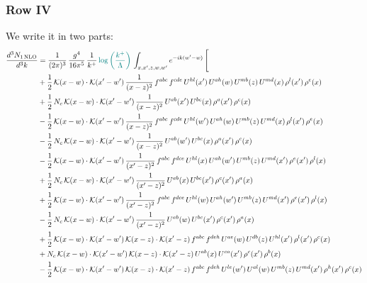 \documentclass[9pt]{article}
\numberwithin{equation}{section}
\begin{document}
\subsubsection{Row IV}
We write it in two parts: 
\begin{align}
\frac{d^{3}N_{1\,\mathrm{NLO}}}{d^{3}k} & = \frac{1}{(2\pi)^{3}}\,\frac{g^{4}}{16\pi^{5}}\,\frac{1}{k^{+}}\,{\color{teal}\log{\left(\frac{k^{+}}{\Lambda}\right)}}\,\int_{x,x',z,w,w'}e^{-ik(w'-w)}\,\Bigg[\notag\\ & 
 +\frac{1}{2}\,\mathcal{K}(x-w)\cdot\mathcal{K}(x'-w')\,\frac{1}{(x-z)^{2}}\,f^{abc}\,f^{cde}\,U^{hl}(x')\,U^{ah}(w)\,U^{mb}(z)\,U^{md}(x)\,\rho^{l}(x')\,\rho^{e}(x)\notag\\
& +\frac{1}{2}\,N_{c}\,\mathcal{K}(x-w)\cdot\mathcal{K}(x'-w')\,\frac{1}{(x-z)^{2}}\,U^{ab}(x')\,U^{bc}(x)\,\rho^{a}(x')\,\rho^{c}(x)\notag\\
& -\frac{1}{2}\,\mathcal{K}(x-w)\cdot\mathcal{K}(x'-w')\,\frac{1}{(x-z)^{2}}\,f^{abc}\,f^{cde}\,U^{hl}(w')\,U^{ah}(w)\,U^{mb}(z)\,U^{md}(x)\,\rho^{l}(x')\,\rho^{e}(x)\notag\\
& -\frac{1}{2}\,N_{c}\,\mathcal{K}(x-w)\cdot\mathcal{K}(x'-w')\,\frac{1}{(x-z)^{2}}\,U^{ab}(w')\,U^{bc}(x)\,\rho^{a}(x')\,\rho^{c}(x)\notag\\
& -\frac{1}{2}\,\mathcal{K}(x-w)\cdot\mathcal{K}(x'-w')\,\frac{1}{(x'-z)^{2}}\,f^{abc}\,f^{dce}\,U^{hl}(x)\,U^{ah}(w')\,U^{mb}(z)\,U^{md}(x')\,\rho^{e}(x')\,\rho^{l}(x)\notag\\
& +\frac{1}{2}\,N_{c}\,\mathcal{K}(x-w)\cdot\mathcal{K}(x'-w')\,\frac{1}{(x'-z)^{2}}\,U^{ab}(x)\,U^{bc}(x')\,\rho^{c}(x')\,\rho^{a}(x)\notag\\
& +\frac{1}{2}\,\mathcal{K}(x-w)\cdot\mathcal{K}(x'-w')\,\frac{1}{(x'-z)^{2}}\,f^{abc}\,f^{dce}\,U^{hl}(w)\,U^{ah}(w')\,U^{mb}(z)\,U^{md}(x')\,\rho^{e}(x')\,\rho^{l}(x)\notag\\
& -\frac{1}{2}\,N_{c}\,\mathcal{K}(x-w)\cdot\mathcal{K}(x'-w')\,\frac{1}{(x'-z)^{2}}\,U^{ab}(w)\,U^{bc}(x')\,\rho^{c}(x')\,\rho^{a}(x)\notag\\
& +\frac{1}{2}\,\mathcal{K}(x-w)\cdot\mathcal{K}(x'-w')\,\mathcal{K}(x-z)\cdot\mathcal{K}(x'-z)\,f^{abc}\,f^{deh}\,U^{ae}(w)\,U^{db}(z)\,U^{hl}(x')\,\rho^{l}(x')\,\rho^{c}(x)\notag\\
& +N_{c}\,\mathcal{K}(x-w)\cdot\mathcal{K}(x'-w')\,\mathcal{K}(x-z)\cdot\mathcal{K}(x'-z)\,U^{ab}(x)\,U^{ca}(x')\,\rho^{c}(x')\,\rho^{b}(x)\notag\\
& -\frac{1}{2}\,\mathcal{K}(x-w)\cdot\mathcal{K}(x'-w')\,\mathcal{K}(x-z)\cdot\mathcal{K}(x'-z)\,f^{abc}\,f^{deh}\,U^{le}(w')\,U^{al}(w)\,U^{mb}(z)\,U^{md}(x')\,\rho^{h}(x')\,\rho^{c}(x)\notag\\

\end{align}
\end{document}
